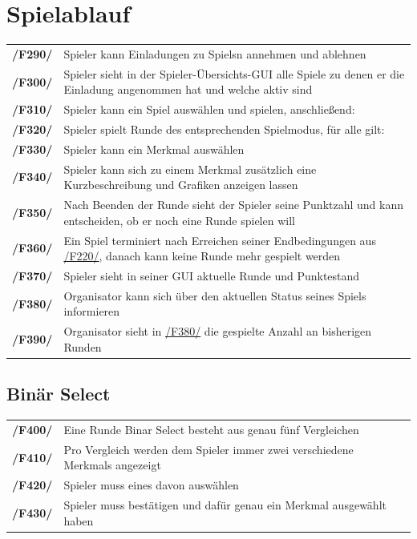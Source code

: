 \documentclass[a4paper]{scrreprt}
\begin{document}
    \section{Spielablauf} 
    \begin{tabularx}{\linewidth}{@{}>{\bfseries}l@{\hspace{.5em}}X@{}}
    \hypertarget{F290}{/F290/} & \Gls{Spieler} kann Einladungen zu \Glspl{Spiel}n annehmen und ablehnen \\
    \hypertarget{F300}{/F300/} & \Gls{Spieler} sieht in der Spieler-Übersichts-GUI alle Spiele zu denen er die Einladung angenommen hat und welche aktiv sind \\
    \hypertarget{F310}{/F310/} & \Gls{Spieler} kann ein \Gls{Spiel} auswählen und spielen, anschließend: \\
    \hypertarget{F320}{/F320/} & \Gls{Spieler} spielt Runde des entsprechenden \Gls{Spielmodus}, für alle gilt: \\
    \hypertarget{F330}{/F330/} & \Gls{Spieler} kann ein \Gls{Merkmal} auswählen \\
    \hypertarget{F340}{/F340/} & \Gls{Spieler} kann sich zu einem \Gls{Merkmal} zusätzlich eine Kurzbeschreibung und Grafiken anzeigen lassen \\
    \hypertarget{F350}{/F350/} & Nach Beenden der Runde sieht der \Gls{Spieler} seine Punktzahl und kann entscheiden, ob er noch eine Runde spielen will \\
	\hypertarget{F360}{/F360/} & Ein \Gls{Spiel} terminiert nach Erreichen seiner Endbedingungen aus \hyperlink{F220}{/F220/}, danach kann keine Runde mehr gespielt werden \\
    \hypertarget{F370}{/F370/} & \Gls{Spieler} sieht in seiner GUI aktuelle Runde und Punktestand \\
	\hypertarget{F380}{/F380/} & \Gls{Organisator} kann sich über den aktuellen Status seines \Gls{Spiel}s informieren \\ %
    \hypertarget{F390}{/F390/} & \Gls{Organisator} sieht in \hyperlink{F380}{/F380/} die gespielte Anzahl an bisherigen Runden
    \end{tabularx}
    
    \subsection{Binär Select}
    \label{sec:Binar}
    \begin{tabularx}{\linewidth}{@{}>{\bfseries}l@{\hspace{.5em}}X@{}}
        \hypertarget{F400}{/F400/} & Eine Runde \Gls{Binar Select} besteht aus genau fünf Vergleichen \\
    	\hypertarget{F410}{/F410/} & Pro Vergleich werden dem \Gls{Spieler} immer zwei verschiedene \Glspl{Merkmal} angezeigt \\
    	\hypertarget{F420}{/F420/} & \Gls{Spieler} muss eines davon auswählen \\
    	\hypertarget{F430}{/F430/} & \Gls{Spieler} muss bestätigen und dafür genau ein \Gls{Merkmal} ausgewählt haben \\
    \end{tabularx}
\end{document}
